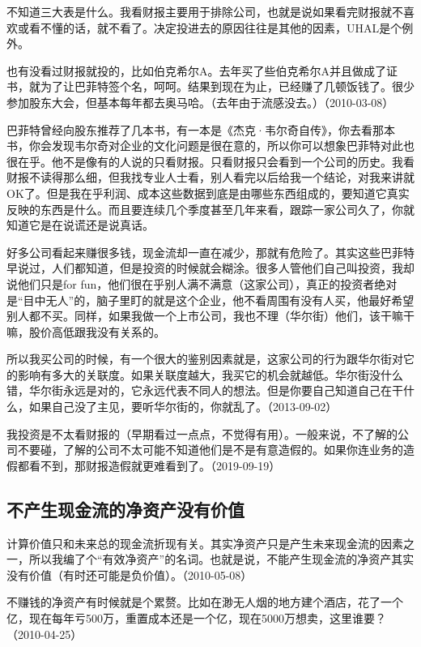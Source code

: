 不知道三大表是什么。我看财报主要用于排除公司，也就是说如果看完财报就不喜欢或看不懂的话，就不看了。决定投进去的原因往往是其他的因素，UHAL是个例外。

也有没看过财报就投的，比如伯克希尔A。去年买了些伯克希尔A并且做成了证书，就为了让巴菲特签个名，呵呵。结果到现在为止，已经赚了几顿饭钱了。很少参加股东大会，但基本每年都去奥马哈。（去年由于流感没去。）（2010-03-08）

巴菲特曾经向股东推荐了几本书，有一本是《杰克·韦尔奇自传》，你去看那本书，你会发现韦尔奇对企业的文化问题是很在意的，所以你可以想象巴菲特对此也很在乎。他不是像有的人说的只看财报。只看财报只会看到一个公司的历史。我看财报不读得那么细，但我找专业人士看，别人看完以后给我一个结论，对我来讲就OK了。但是我在乎利润、成本这些数据到底是由哪些东西组成的，要知道它真实反映的东西是什么。而且要连续几个季度甚至几年来看，跟踪一家公司久了，你就知道它是在说谎还是说真话。

好多公司看起来赚很多钱，现金流却一直在减少，那就有危险了。其实这些巴菲特早说过，人们都知道，但是投资的时候就会糊涂。很多人管他们自己叫投资，我却说他们只是for fun，他们很在乎别人满不满意（这家公司），真正的投资者绝对是“目中无人”的，脑子里盯的就是这个企业，他不看周围有没有人买，他最好希望别人都不买。同样，如果我做一个上市公司，我也不理（华尔街）他们，该干嘛干嘛，股价高低跟我没有关系的。

所以我买公司的时候，有一个很大的鉴别因素就是，这家公司的行为跟华尔街对它的影响有多大的关联度。如果关联度越大，我买它的机会就越低。华尔街没什么错，华尔街永远是对的，它永远代表不同人的想法。但是你要自己知道自己在干什么，如果自己没了主见，要听华尔街的，你就乱了。（2013-09-02）


我投资是不太看财报的（早期看过一点点，不觉得有用）。一般来说，不了解的公司不要碰，了解的公司不太可能不知道他们是不是有意造假的。如果你连业务的造假都看不到，那财报造假就更难看到了。（2019-09-19）

\subsection{不产生现金流的净资产没有价值}

计算价值只和未来总的现金流折现有关。其实净资产只是产生未来现金流的因素之一，所以我编了个“有效净资产”的名词。也就是说，不能产生现金流的净资产其实没有价值（有时还可能是负价值）。（2010-05-08）

不赚钱的净资产有时候就是个累赘。比如在渺无人烟的地方建个酒店，花了一个亿，现在每年亏500万，重置成本还是一个亿，现在5000万想卖，这里谁要？（2010-04-25）

